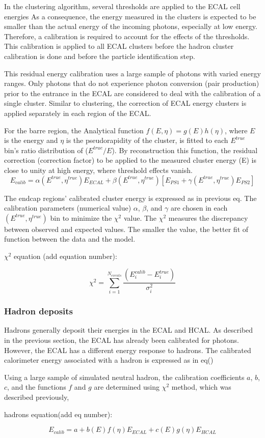 In the clustering algorithm, several thresholds are applied to the ECAL cell energies %
As a consequence, the energy measured in the clusters is expected to be smaller than the actual energy of the incoming photons, especially at low energy.
Therefore, a calibration is required to account for the effects of the thresholds.
This calibration is applied to all ECAL clusters before the hadron cluster calibration is done and before the particle identification step.

This residual energy calibration uses a large sample of photons with varied energy ranges.
Only photons that do not experience photon conversion (pair production) prior to the entrance in the ECAL are considered to deal with the calibration of a single cluster.
Similar to clustering, the correction of ECAL energy clusters is applied separately in each region of the ECAL.

For the barre region, the Analytical function $f(E,\eta) = g(E)h(\eta)$, where $E$ is the energy and $\eta$ is the pseudorapidity of the cluster, is fitted to each $E^{true}$ bin's ratio distribution of ($E^{true}/E$).
By reconstruction this function, the residual correction (correction factor) to be applied to the measured cluster energy (E) is close to unity at high energy, where threshold effects vanish.
$$E_{calib} = \alpha (E^{true}, \eta^{true})E_{ECAL} + \beta(E^{true},\eta^{true})[E_{PS1}+\gamma(E^{true},\eta^{true})E_{PS2}]$$

The endcap regions' calibrated cluster energy is expressed as in previous eq. The calibration parameters (numerical value) $\alpha$, $\beta$, and $\gamma$ are chosen in each $(E^{true},\eta^{true})$ bin to minimize the $\chi^{2}$ value. The $\chi^{2}$ measures the discrepancy between observed and expected values. The smaller the value, the better fit of function between the data and the model.

$\chi^{2}$ equation (add equation number):

$$\chi^2= \sum_{i=1}^{N_{events}} \frac{(E_{i}^{calib} - E_{i}^{true})} {\sigma_{i}^{2}} $$


\subsubsection{Hadron deposits}

Hadrons generally deposit their energies in the ECAL and HCAL.
As described in the previous section, the ECAL has already been calibrated for photons.
However, the ECAL has a different energy response to hadrons.
The calibrated calorimeter energy associated with a hadron is expressed as in eq()

Using a large sample of simulated neutral hadron, the calibration coefficients $a$, $b$, $c$, and the functions $f$ and $g$ are determined using $\chi^{2}$ method, which was described previously, 

hadrons equation(add eq number):

$$ E_{calib} = a + b(E)f(\eta)E_{ECAL} + c(E)g(\eta)E_{HCAL} $$ %
